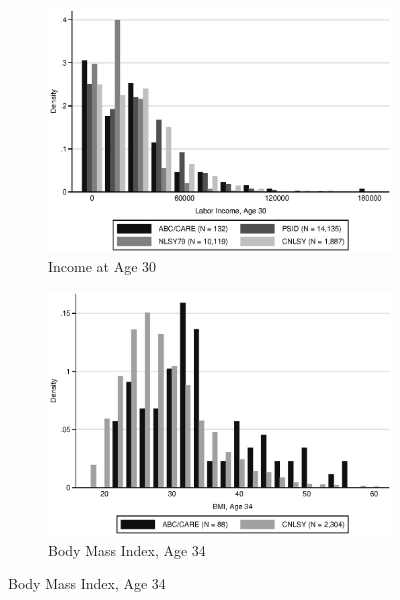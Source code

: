 \begin{figure}[H]
	\ContinuedFloat
	
	\begin{subfigure}[h]{0.8\textwidth}
	\centering
	\caption{Income at Age 30} \label{fig:support_inc30}
	\includegraphics[width=\textwidth]{AppOutput/Methodology/support_inc30.eps}
	\end{subfigure}

	
	\begin{subfigure}[h]{0.8\textwidth}
	\centering
	\caption{Body Mass Index, Age 34} \label{fig:support_bmi}
	\includegraphics[width=\textwidth]{AppOutput/Methodology/support_bmi.eps}
	\end{subfigure}
	
\end{figure}

